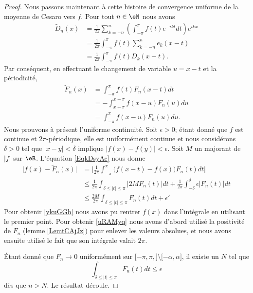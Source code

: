\begin{proof}
    Nous passons maintenant à cette histoire de convergence uniforme de la moyenne de Cesaro vers \( f\). Pour tout \( n\in \eN\) nous avons
    \begin{subequations}
        \begin{align}
            \tilde  D_n(x)&=\frac{1}{ 2\pi }\sum_{k=-n}^n\left( \int_{-\pi}^{\pi}f(t) e^{-ikt}dt \right) e^{ikx}\\
            &=\frac{1}{ 2\pi }\int_{-\pi}^{\pi}f(t)\sum_{k=-n}^ne_k(x-t)\\
            &=\frac{1}{ 2\pi }\int_{-\pi}^{\pi}f(t)D_k(x-t).
        \end{align}
    \end{subequations}
    Par conséquent, en effectuant le changement de variable \( u=x-t\) et la périodicité,
    \begin{subequations}    \label{EqkDsyAc}
        \begin{align}
            \tilde F_n(x)&=\int_{-\pi}^{\pi}f(t)F_n(x-t)dt\\
            &=-\int_{x+\pi}^{x-\pi}f(x-u)F_n(u)du\\
            &=\int_{-\pi}^{\pi}f(x-u) F_n(u)du.
        \end{align}
    \end{subequations}
    Nous prouvons à présent l'uniforme continuité. Soit \( \epsilon>0\); étant donné que \( f\) est continue et \( 2\pi\)-périodique, elle est uniformément continue et nous considérons \( \delta>0\) tel que \( | x-y |<\delta\) implique \( \big| f(x)-f(y) \big|<\epsilon\). Soit \( M\) un majorant de \( | f |\) sur \( \eR\). L'équation \eqref{EqkDsyAc} nous donne
    \begin{subequations}
        \begin{align}
            \big| f(x)-\tilde F_n(x) \big|&=\big| \frac{1}{ 2\pi }\int_{-\pi}^{\pi}\big( f(x-t)-f(x) \big)F_n(t)dt \big|    \label{ykuGGh}\\
            &\leq\frac{1}{ 2\pi }\int_{\delta\leq| t |\leq \pi}| 2MF_n(t) |dt+\frac{1}{ 2\pi }\int_{-\delta}^{\delta}\epsilon| F_n(t) |dt\\
            &\leq\frac{ 2M }{ 2\pi }\int_{\delta\leq | t |\leq\pi}F_n(t)dt+\epsilon'    \label{uRAMyq}
        \end{align}
    \end{subequations}
    Pour obtenir \eqref{ykuGGh} nous avons pu rentrer \( f(x)\) dans l'intégrale en utilisant le premier point. Pour obtenir \eqref{uRAMyq} nous avons d'abord utilisé la positivité de \( F_n\) (lemme \ref{LemtCAjJz}) pour enlever les valeurs absolues, et nous avons ensuite utilisé le fait que son intégrale valait \( 2\pi\).

    Étant donné que \( F_n\to 0\) uniformément sur \( \mathopen[ -\pi,\pi ,  \mathclose]\setminus\mathopen[ -\alpha , \alpha \mathclose]\), il existe un \( N\) tel que 
    \begin{equation}
        \int_{\delta\leq| t |\leq \pi}F_n(t)dt\leq \epsilon
    \end{equation}
    dès que \( n>N\). Le résultat découle.
\end{proof}

